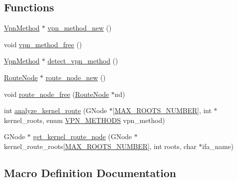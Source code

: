 \subsection*{Functions}
\begin{DoxyCompactItemize}
\item 
\hyperlink{route-tree_8h_a1034dd038389279bf422489d4d99d43a}{Vpn\+Method} $\ast$ \hyperlink{route-tree_8h_a3ccbf1b413fe282c1490701f739273a8}{vpn\+\_\+method\+\_\+new} ()
\item 
void \hyperlink{route-tree_8h_a06257b65d43c86e35b44ae0d91b226cf}{vpn\+\_\+method\+\_\+free} ()
\item 
\hyperlink{route-tree_8h_a1034dd038389279bf422489d4d99d43a}{Vpn\+Method} $\ast$ \hyperlink{route-tree_8h_a267529614de44218b8187f3ac46ce46f}{detect\+\_\+vpn\+\_\+method} ()
\item 
\hyperlink{route-tree_8h_a1296be44c6672a1adb94ba6dc416682c}{Route\+Node} $\ast$ \hyperlink{route-tree_8h_a941ed51572db1d1d4720f8a329dd0d8b}{route\+\_\+node\+\_\+new} ()
\item 
void \hyperlink{route-tree_8h_a1b80d492072ee18f906bdd2fbaad9b4b}{route\+\_\+node\+\_\+free} (\hyperlink{route-tree_8h_a1296be44c6672a1adb94ba6dc416682c}{Route\+Node} $\ast$nd)
\item 
int \hyperlink{route-tree_8h_a967fa487bc211d2b9e159ba5be25d641}{analyze\+\_\+kernel\+\_\+route} (G\+Node $\ast$\mbox{[}\hyperlink{route-tree_8h_a8e1da3af3417de420798c8b448b6a8cb}{M\+A\+X\+\_\+\+R\+O\+O\+T\+S\+\_\+\+N\+U\+M\+B\+ER}\mbox{]}, int $\ast$kernel\+\_\+roots, enum \hyperlink{route-tree_8h_a5b876670828c4e38106ba1c6d91024b7}{V\+P\+N\+\_\+\+M\+E\+T\+H\+O\+DS} vpn\+\_\+method)
\item 
G\+Node $\ast$ \hyperlink{route-tree_8h_a77affcaa875961893c05c7e211678ed1}{get\+\_\+kernel\+\_\+route\+\_\+node} (G\+Node $\ast$kernel\+\_\+route\+\_\+roots\mbox{[}\hyperlink{route-tree_8h_a8e1da3af3417de420798c8b448b6a8cb}{M\+A\+X\+\_\+\+R\+O\+O\+T\+S\+\_\+\+N\+U\+M\+B\+ER}\mbox{]}, int roots, char $\ast$ifa\+\_\+name)
\end{DoxyCompactItemize}


\subsection{Macro Definition Documentation}
\mbox{\label{route-tree_8h_a5f66955385e84e67789d731b5cad24c7}} 
